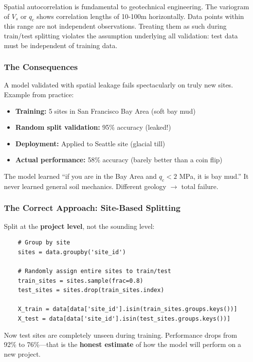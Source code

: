 \documentclass[12pt]{article}
\begin{document}
Spatial autocorrelation is fundamental to geotechnical engineering. The variogram of $V_s$ or $q_c$ shows correlation lengths of 10-100m horizontally. Data points within this range are not independent observations. Treating them as such during train/test splitting violates the assumption underlying all validation: test data must be independent of training data.

\subsubsection{The Consequences}

A model validated with spatial leakage fails spectacularly on truly new sites. Example from practice:

\begin{itemize}
	\item \textbf{Training:} 5 sites in San Francisco Bay Area (soft bay mud)
	\item \textbf{Random split validation:} 95\% accuracy (leaked!)
	\item \textbf{Deployment:} Applied to Seattle site (glacial till)
	\item \textbf{Actual performance:} 58\% accuracy (barely better than a coin flip)
\end{itemize}

The model learned ``if you are in the Bay Area and $q_c < 2$ MPa, it is bay mud.'' It never learned general soil mechanics. Different geology $\to$ total failure.

\subsubsection{The Correct Approach: Site-Based Splitting}

Split at the \textbf{project level}, not the sounding level:

\begin{lstlisting}
	# Group by site
	sites = data.groupby('site_id')
	
	# Randomly assign entire sites to train/test
	train_sites = sites.sample(frac=0.8)
	test_sites = sites.drop(train_sites.index)
	
	X_train = data[data['site_id'].isin(train_sites.groups.keys())]
	X_test = data[data['site_id'].isin(test_sites.groups.keys())]
\end{lstlisting}

Now test sites are completely unseen during training. Performance drops from 92\% to 76\%---that is the \textbf{honest estimate} of how the model will perform on a new project.
\end{document}
